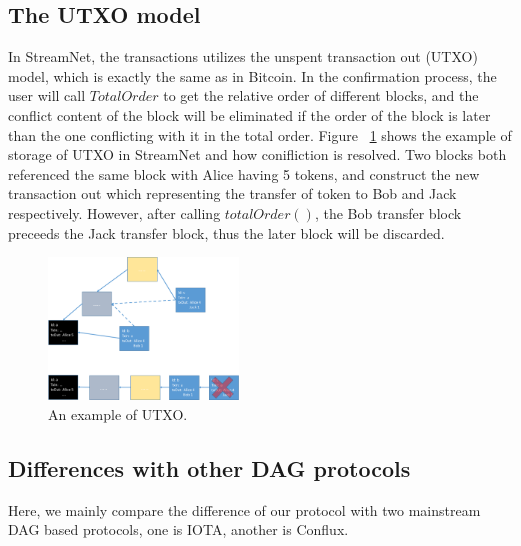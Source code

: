 \subsection{The UTXO model}

In StreamNet, the transactions utilizes the unspent transaction out (UTXO) model, which is exactly the same as in Bitcoin.
In the confirmation process, the user will call $TotalOrder$ to get the relative order of different blocks, 
and the conflict content of the block will be eliminated if the order of the block is later than the one conflicting with it in the total order.
Figure ~\ref{utxo} shows the example of storage of UTXO in StreamNet and how conifliction is resolved.
Two blocks both referenced the same block with Alice having 5 tokens, and construct the new transaction out which representing the transfer of token to Bob and Jack respectively.
However, after calling $totalOrder()$, the Bob transfer block preceeds the Jack transfer block, thus the later block will be discarded.

\begin{figure}[!ht]
\begin{center}
\includegraphics[width=0.45\textwidth]{figures/utxo.pdf}
    \caption{
        An example of UTXO.
     }
\label{utxo}
\end{center}
\end{figure}

\subsection{Differences with other DAG protocols}
Here, we mainly compare the difference of our protocol with two mainstream DAG based protocols, one is IOTA, another is Conflux.

